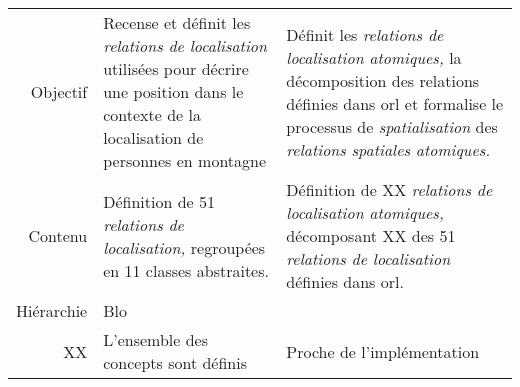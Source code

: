 \begin{tabular}{r>{\small}p{}>{\small}p{}}
  \toprule & \multicolumn{1}{c}{\ac{orl}} &
  \multicolumn{1}{c}{\ac{orla}} \\ \midrule
  \addlinespace
  Objectif & Recense et définit les \emph{relations de localisation} utilisées
  pour décrire une position dans le contexte de la localisation de
  personnes en montagne & Définit les \emph{relations de localisation
                          atomiques,} la décomposition des relations
  définies dans \ac{orl} et formalise le processus de
                          \emph{spatialisation} des \emph{relations
                          spatiales atomiques.}\\
  Contenu & Définition de 51 \emph{relations de localisation,}
            regroupées en 11 classes abstraites. & Définition de XX
                                                   \emph{relations de
                                                   localisation
                                                   atomiques,}
                                                   décomposant XX des
                                                   51 \emph{relations
                                                   de localisation}
                                                   définies dans \ac{orl}.\\
  Hiérarchie & Blo & \\
  XX & L'ensemble des concepts sont définis & Proche de l'implémentation \\
  \bottomrule
\end{tabular}
